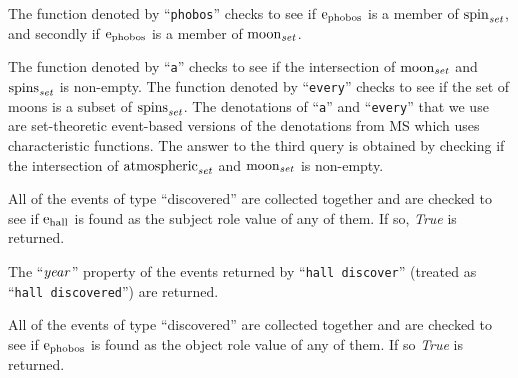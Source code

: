 \documentclass[../main.tex]{subfiles}
\begin{document}
\begin{refsection}


\examplespacing

\noindent The function denoted by ``\texttt{phobos}'' checks to see if $\mathrm{e}_{\operatorname{phobos}}$ is a member of $\operatorname{spin}_{\operatorname{\mathit{set}}}$, and secondly if $\mathrm{e}_{\operatorname{phobos}}$ is a member of $\operatorname{moon}_{\operatorname{\mathit{set}}}$.

\examplespacing




\examplespacing

\noindent The function denoted by ``\texttt{a}'' checks to see if the intersection of $\operatorname{moon}_{\operatorname{\mathit{set}}}$ and $\operatorname{spins}_{\operatorname{\mathit{set}}}$ is non-empty. The function denoted by ``\texttt{every}'' checks to see if the set of moons is a subset of $\operatorname{spins}_{\operatorname{\mathit{set}}}$. The denotations of ``\texttt{a}'' and ``\texttt{every}'' that we use are set-theoretic event-based versions of the denotations from MS which uses characteristic functions.
The answer to the third query is obtained by checking if the intersection of $\operatorname{atmospheric}_{\operatorname{\mathit{set}}}$ and $\operatorname{moon}_{\operatorname{\mathit{set}}}$ is non-empty.

\examplespacing


\examplespacing

\noindent All of the events of type ``discovered'' are collected together and are checked to see if $\mathrm{e}_{\operatorname{hall}}$ is found as the subject role value of any of them. If so, \textit{True} is returned.

\examplespacing


\examplespacing

\noindent The ``$\operatorname{\mathit{year}}$'' property of the  events returned by ``\texttt{hall discover}'' (treated as ``\texttt{hall discovered}'') are returned.

\examplespacing


\examplespacing

\noindent All of the events of type ``discovered'' are collected together and are checked to see if $\mathrm{e}_{\operatorname{phobos}}$ is found as the object role value of any of them. If so \textit{True} is returned.


\end{refsection}
\end{document}
